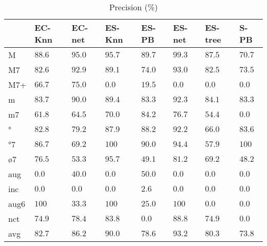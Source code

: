 \documentclass{article}
\begin{document}
\begin{table}
  \centering
\begin{tabular}{l|p{0.5cm}p{0.5cm}p{0.5cm}p{0.5cm}p{0.5cm}p{0.5cm}p{0.5cm}}
    &      EC-Knn &      EC-net &      ES-Knn &       ES-PB &      ES-net &     ES-tree &        S-PB   \\ \hline
M   & $     88.6$ & $     95.0$ & $     95.7$ & $     89.7$ & $     99.3$ & $     87.5$ & $     70.7$   \\
M7  & $     82.6$ & $     92.9$ & $     89.1$ & $     74.0$ & $     93.0$ & $     82.5$ & $     73.5$   \\
M7+ & $     66.7$ & $     75.0$ & $      0.0$ & $     19.5$ & $      0.0$ & $      0.0$ & $      0.0$   \\
m   & $     83.7$ & $     90.0$ & $     89.4$ & $     83.3$ & $     92.3$ & $     84.1$ & $     83.3$   \\
m7  & $     61.8$ & $     64.5$ & $     70.0$ & $     84.2$ & $     76.7$ & $     54.4$ & $      0.0$   \\
°   & $     82.8$ & $     79.2$ & $     87.9$ & $     88.2$ & $     92.2$ & $     66.0$ & $     83.6$   \\
°7  & $     86.7$ & $     69.2$ & $    100$ & $     90.0$ & $     94.4$ & $     57.9$ & $    100$   \\
ø7  & $     76.5$ & $     53.3$ & $     95.7$ & $     49.1$ & $     81.2$ & $     69.2$ & $     48.2$   \\
aug & $      0.0$ & $     40.0$ & $      0.0$ & $     50.0$ & $      0.0$ & $      0.0$ & $      0.0$   \\
inc & $      0.0$ & $      0.0$ & $      0.0$ & $      2.6$ & $      0.0$ & $      0.0$ & $      0.0$   \\
aug6& $    100$ & $     33.3$ & $    100$ & $     25.0$ & $    100$ & $      0.0$ & $      0.0$   \\
nct & $     74.9$ & $     78.4$ & $     83.8$ & $      0.0$ & $     88.8$ & $     74.9$ & $      0.0$   \\
avg & $     82.7$ & $     86.2$ & $     90.0$ & $     78.6$ & $     93.2$ & $     80.3$ & $     73.8$   \\
\end{tabular}


  \caption{Precision (\%)}
  \label{tab:precision}
\end{table}
\end{document}
